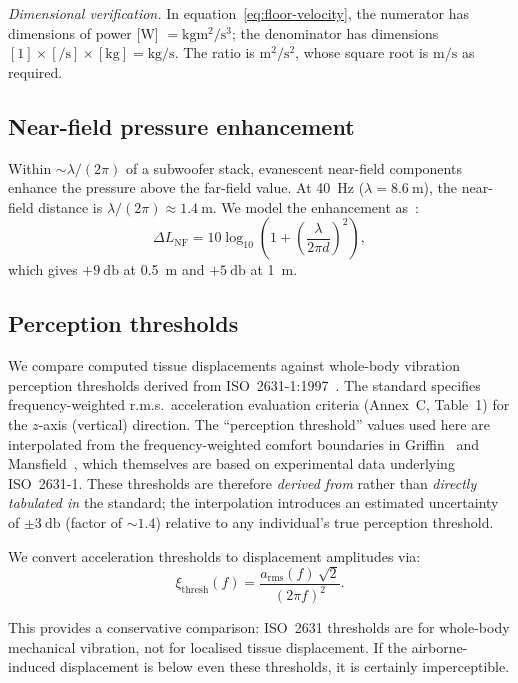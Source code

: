 \emph{Dimensional verification.}  In equation~\eqref{eq:floor-velocity},
the numerator has dimensions of power [\si{\watt}] $=
\si{\kilogram\metre\squared\per\second\cubed}$; the denominator has
dimensions $[1]\times[\si{\per\second}]\times[\si{\kilogram}] =
\si{\kilogram\per\second}$.  The ratio is
$\si{\metre\squared\per\second\squared}$, whose square root is
$\si{\metre\per\second}$ as required.

\subsection{Near-field pressure enhancement}
\label{sec:near-field}

Within ${\sim}\lambda/(2\pi)$ of a subwoofer stack, evanescent
near-field components enhance the pressure above the far-field value.
At \SI{40}{\hertz} ($\lambda = \SI{8.6}{\metre}$), the near-field
distance is $\lambda/(2\pi) \approx \SI{1.4}{\metre}$.  We model the
enhancement as~\cite{Junger2012}:
%
\begin{equation}
  \Delta L_\mathrm{NF} = 10\log_{10}\!\left(1 +
    \left(\frac{\lambda}{2\pi d}\right)^2\right),
  \label{eq:near-field}
\end{equation}
%
which gives $+\SI{9}{\decibel}$ at \SI{0.5}{\metre} and
$+\SI{5}{\decibel}$ at \SI{1}{\metre}.

\subsection{Perception thresholds}
\label{sec:perception-model}

We compare computed tissue displacements against whole-body vibration
perception thresholds derived from ISO~2631-1:1997~\cite{iso2631}.
The standard specifies frequency-weighted r.m.s.\ acceleration
evaluation criteria (Annex~C, Table~1) for the $z$-axis (vertical)
direction.  The ``perception threshold'' values used here are
interpolated from the frequency-weighted comfort boundaries in
Griffin~\cite{Griffin1990} and Mansfield~\cite{Mansfield2005}, which
themselves are based on experimental data underlying
ISO~2631-1.  These thresholds are therefore \emph{derived from} rather
than \emph{directly tabulated in} the standard; the interpolation
introduces an estimated uncertainty of ${\pm}\SI{3}{\decibel}$ (factor
of ${\sim}1.4$) relative to any individual's true perception threshold.

We convert acceleration thresholds to displacement amplitudes via:
%
\begin{equation}
  \xi_\mathrm{thresh}(f) = \frac{a_\mathrm{rms}(f)\,\sqrt{2}}{(2\pi f)^2}.
  \label{eq:perception-disp}
\end{equation}

This provides a conservative comparison: ISO~2631 thresholds are for
whole-body mechanical vibration, not for localised tissue displacement.
If the airborne-induced displacement is below even these thresholds, it
is certainly imperceptible.